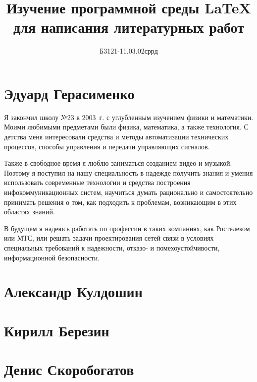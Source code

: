 \documentclass[labwork]{fefudoc}
\author{Б3121-11.03.02сррд}{Герасименко Эдуард}
\title{Изучение программной среды \LaTeX{} для написания литературных работ}
\begin{document}
\frontpage
\tableofcontents

\section{Эдуард Герасименко}
Я закончил школу №23 в 2003~г. с углубленным изучением физики и математики. Моими любимыми предметами были физика, математика, а также технология. С детства меня интересовали средства и методы автоматизации технических процессов, способы управления и передачи управляющих сигналов.

Также в свободное время я люблю заниматься созданием видео и музыкой. Поэтому я поступил на нашу специальность в надежде получить знания и умения использовать современные технологии и средства построения инфокоммуникационных систем, научиться думать рационально и самостоятельно принимать решения о том, как подходить к проблемам, возникающим в этих областях знаний.

В будущем я надеюсь работать по профессии в таких компаниях, как Ростелеком или МТС, или решать задачи проектирования сетей связи в условиях специальных требований к надежности, отказо- и помехоустойчивости, информационной безопасности.

\section{Александр Кулдошин}
\section{Кирилл Березин}
\section{Денис Скоробогатов}
\end{document}

